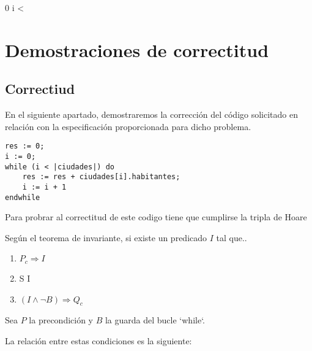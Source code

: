 \documentclass[10pt,a4paper]{article}
\begin{document}
{
	0 \leq i < 
}





\section{Demostraciones de correctitud}

\subsection{Correctiud}
En el siguiente apartado, demostraremos la corrección del código solicitado  en relación con la especificación proporcionada para dicho problema.  

\begin{lstlisting}
res := 0;
i := 0;
while (i < |ciudades|) do
	res := res + ciudades[i].habitantes;
	i := i + 1
endwhile
\end{lstlisting}


Para probrar al correctitud de este codigo tiene que cumplirse la tripla de Hoare 

Según el teorema de invariante, si existe un predicado $I$ tal que.. \par

\begin{enumerate}
	\item $P_c \Longrightarrow I$
	\item {} {S} {I}
	\item $(I \wedge  \neg B) \Longrightarrow Q_c$
\end{enumerate}

Sea \( P \) la precondición y \( B \) la guarda del bucle `while`.

La relación entre estas condiciones es la siguiente:
\end{document}
